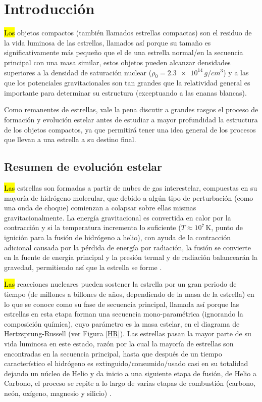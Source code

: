\chapter{Introducción}

\hl{Los} objetos compactos (también llamados estrellas compactas) son el residuo de la vida luminosa de las estrellas, llamados así porque su tamaño es significativamente más pequeño que el de una estrella normal/en la secuencia principal con una masa similar, estos objetos pueden alcanzar densidades superiores a la densidad de saturación nuclear  ($\rho_0=\num{2.3e+14}\,\si{g/cm^3}$) y a las que los potenciales gravitacionales son tan grandes que la relatividad general es importante para determinar su estructura (exceptuando a las enanas blancas). 

Como remanentes de estrellas, vale la pena discutir a grandes rasgos el proceso de formación y evolución estelar antes de estudiar a mayor profundidad la estructura de los objetos compactos, ya que permitirá tener una idea general de los procesos que llevan a una estrella a su destino final.    

\section{Resumen de evolución estelar}
\hl{Las} estrellas son formadas a partir de nubes de gas interestelar, compuestas en su mayoría de hidrógeno molecular, que debido a algún tipo de perturbación (como una onda de choque) comienzan a colapsar sobre ellas mismas gravitacionalmente. La energía gravitacional es convertida en calor por la contracción y si la temperatura incrementa lo suficiente ($T \approx 10^7 \, \si{\kelvin}$, punto de ignición para la fusión de hidrógeno a helio), con ayuda de la contracción adicional causada por la pérdida de energía por radiación, la fusión se convierte en la fuente de energía principal y la presión termal y de radiación balancearán la gravedad, permitiendo así que la estrella se forme \cite{Glendenning2000,Padmanabhan2000}.

\hl{Las} reacciones nucleares pueden sostener la estrella por un gran periodo de tiempo (de millones a billones de años, dependiendo de la masa de la estrella) en lo que se conoce como su fase de secuencia principal, llamada así porque las estrellas en esta etapa forman una secuencia mono-paramétrica (ignorando la composición química), cuyo parámetro es la masa estelar, en el diagrama de Hertzsprung-Russell (ver Figura \ref{HR}).
Las estrellas pasan la mayor parte de su vida luminosa en este estado, razón por la cual la mayoría de estrellas son encontradas en la secuencia principal, hasta que después de un tiempo característico el hidrógeno es extinguido/consumido/usado casi en su totalidad dejando un núcleo de Helio y da inicio a una siguiente etapa de fusión, de Helio a Carbono, el proceso se repite a lo largo de varias etapas de combustión (carbono, neón, oxígeno, magnesio y silicio) \cite{Scilla2016}. 

